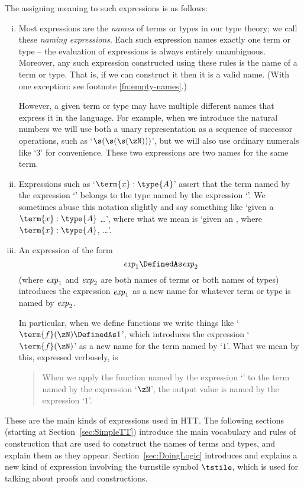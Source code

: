 The  assigning meaning to such expressions is as follows:
%
\begin{enumerate}[(i)]
\item Most expressions are the \emph{names} of terms or types in our type theory; we call these \emph{naming expressions}. Each such expression names exactly one term or type -- the evaluation of expressions is always entirely unambiguous. Moreover, any such expression constructed using these rules is the name of a term or type. That is, if we can construct it then it is a valid name. (With one exception: see footnote \ref{fn:empty-names}.)

However, a given term or type may have multiple different names that express it in the language. For example, when we introduce the natural numbers we will use both a unary representation as a sequence of successor operations, such as `$\s(\s(\s(\zN)))$', but we will also use ordinary numerals like `$3$' for convenience. These two expressions are two names for the same term.
%
\item Expressions such as `$\term{x}:\type{A}$' assert that the term named by the expression `' belongs to the type named by the expression `'. We sometimes abuse this notation slightly and say something like `given a $\term{x}:\type{A}$ \ldots', where what we mean is `given an , where $\term{x}:\type{A}$, \ldots'.
%
\item An expression of the form 
\[
\mbox{\textit{exp}}_1 \DefinedAs
\mbox{\textit{exp}}_2
\]
(where $\mbox{\textit{exp}}_1$ and $\mbox{\textit{exp}}_2$ are both names of terms or both names of types)
introduces the expression $\mbox{\textit{exp}}_1$ as a new name for
whatever term or type is named by $\mbox{\textit{exp}}_2$.

In particular, when we define functions we write things like 
`$\term{f}(\zN) \DefinedAs 1$', 
which introduces the expression `$\term{f}(\zN)$' as a new name for the term named by `$1$'. What we mean by this, expressed verbosely, is
\begin{quote}
When we apply the function named by the expression `' to the term named by the expression `$\zN$', the output value is named by the expression `$1$'.
\end{quote}
%
\end{enumerate}
These are the main kinds of expressions used in HTT. The following sections (starting at Section~\ref{sec:SimpleTT}) introduce the main vocabulary and rules of construction that are used to construct the names of terms and types, and explain them as they appear. Section~\ref{sec:DoingLogic} introduces and explains a new kind of expression involving the turnstile symbol $\tstile$, which is used for talking about proofs and constructions.

